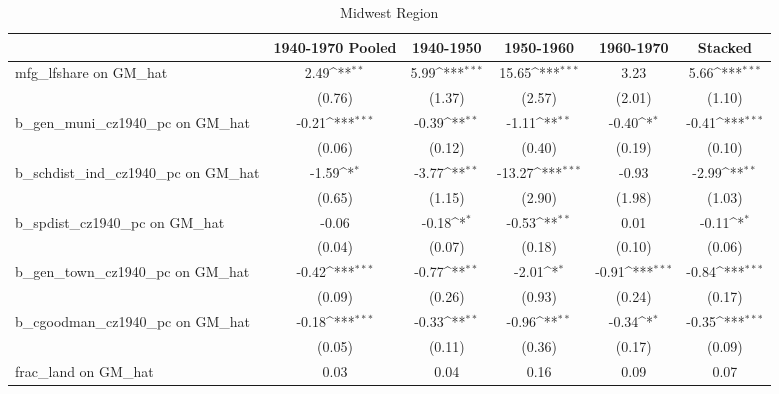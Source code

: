 \begin{table}[htbp]\centering
\def\sym#1{\ifmmode^{#1}\else\(^{#1}\)\fi}
\caption{Midwest Region}
\begin{tabular}{l*{5}{c}}
\toprule
                &\multicolumn{1}{c}{1940-1970 Pooled}&\multicolumn{1}{c}{1940-1950}&\multicolumn{1}{c}{1950-1960}&\multicolumn{1}{c}{1960-1970}&\multicolumn{1}{c}{Stacked}\\
\midrule
mfg\_lfshare on GM\_hat&     2.49\sym{**} &     5.99\sym{***}&    15.65\sym{***}&     3.23         &     5.66\sym{***}\\
                &   (0.76)         &   (1.37)         &   (2.57)         &   (2.01)         &   (1.10)         \\
\addlinespace
b\_gen\_muni\_cz1940\_pc on GM\_hat&    -0.21\sym{***}&    -0.39\sym{**} &    -1.11\sym{**} &    -0.40\sym{*}  &    -0.41\sym{***}\\
                &   (0.06)         &   (0.12)         &   (0.40)         &   (0.19)         &   (0.10)         \\
\addlinespace
b\_schdist\_ind\_cz1940\_pc on GM\_hat&    -1.59\sym{*}  &    -3.77\sym{**} &   -13.27\sym{***}&    -0.93         &    -2.99\sym{**} \\
                &   (0.65)         &   (1.15)         &   (2.90)         &   (1.98)         &   (1.03)         \\
\addlinespace
b\_spdist\_cz1940\_pc on GM\_hat&    -0.06         &    -0.18\sym{*}  &    -0.53\sym{**} &     0.01         &    -0.11\sym{*}  \\
                &   (0.04)         &   (0.07)         &   (0.18)         &   (0.10)         &   (0.06)         \\
\addlinespace
b\_gen\_town\_cz1940\_pc on GM\_hat&    -0.42\sym{***}&    -0.77\sym{**} &    -2.01\sym{*}  &    -0.91\sym{***}&    -0.84\sym{***}\\
                &   (0.09)         &   (0.26)         &   (0.93)         &   (0.24)         &   (0.17)         \\
\addlinespace
b\_cgoodman\_cz1940\_pc on GM\_hat&    -0.18\sym{***}&    -0.33\sym{**} &    -0.96\sym{**} &    -0.34\sym{*}  &    -0.35\sym{***}\\
                &   (0.05)         &   (0.11)         &   (0.36)         &   (0.17)         &   (0.09)         \\
\addlinespace
frac\_land on GM\_hat&     0.03         &     0.04         &     0.16         &     0.09         &     0.07         \\

\end{tabular}
\end{table}

